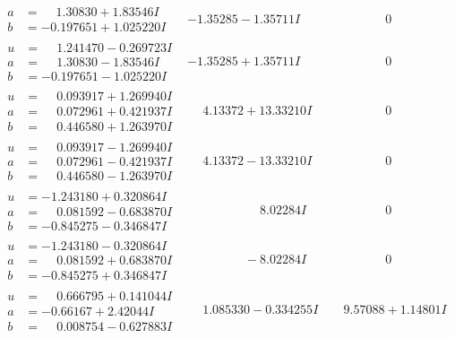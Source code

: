 \documentclass[1p]{elsarticle_modified}
\theoremstyle{definition}
\begin{document}
$$\begin{array}{c|c|c}
\begin{aligned}
a &= \phantom{-}1.30830 + 1.83546 I \\
b &= -0.197651 + 1.025220 I\end{aligned}
 & -1.35285 - 1.35711 I & \phantom{-0.000000 } 0 \\ \hline\begin{aligned}
u &= \phantom{-}1.241470 - 0.269723 I \\
a &= \phantom{-}1.30830 - 1.83546 I \\
b &= -0.197651 - 1.025220 I\end{aligned}
 & -1.35285 + 1.35711 I & \phantom{-0.000000 } 0 \\ \hline\begin{aligned}
u &= \phantom{-}0.093917 + 1.269940 I \\
a &= \phantom{-}0.072961 + 0.421937 I \\
b &= \phantom{-}0.446580 + 1.263970 I\end{aligned}
 & \phantom{-}4.13372 + 13.33210 I & \phantom{-0.000000 } 0 \\ \hline\begin{aligned}
u &= \phantom{-}0.093917 - 1.269940 I \\
a &= \phantom{-}0.072961 - 0.421937 I \\
b &= \phantom{-}0.446580 - 1.263970 I\end{aligned}
 & \phantom{-}4.13372 - 13.33210 I & \phantom{-0.000000 } 0 \\ \hline\begin{aligned}
u &= -1.243180 + 0.320864 I \\
a &= \phantom{-}0.081592 - 0.683870 I \\
b &= -0.845275 - 0.346847 I\end{aligned}
 & \phantom{-0.000000 -}8.02284 I & \phantom{-0.000000 } 0 \\ \hline\begin{aligned}
u &= -1.243180 - 0.320864 I \\
a &= \phantom{-}0.081592 + 0.683870 I \\
b &= -0.845275 + 0.346847 I\end{aligned}
 & \phantom{-0.000000 } -8.02284 I & \phantom{-0.000000 } 0 \\ \hline\begin{aligned}
u &= \phantom{-}0.666795 + 0.141044 I \\
a &= -0.66167 + 2.42044 I \\
b &= \phantom{-}0.008754 - 0.627883 I\end{aligned}
 & \phantom{-}1.085330 - 0.334255 I & \phantom{-}9.57088 + 1.14801 I \\ \hline\begin{aligned}

\end{aligned}
\end{array}$$
\end{document}
